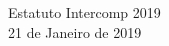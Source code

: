 \begin{center}

	\vspace*{\fill}
	\Huge{Estatuto Intercomp 2019} \\ [.5cm]
	\normalsize{21 de Janeiro de 2019}
	\vspace*{\fill}

\end{center}
